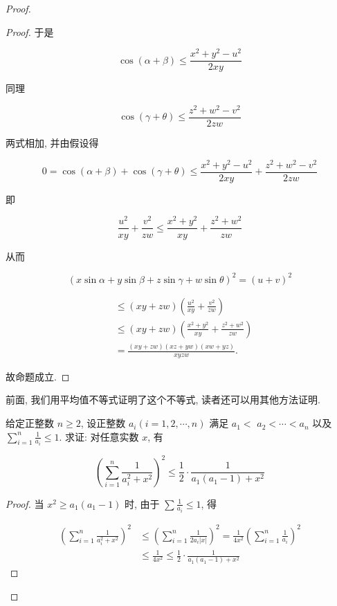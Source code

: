 \begin{proof}
\begin{proof}
	于是
	
	$$
	\cos (\alpha+\beta) \leqslant \frac{x^{2}+y^{2}-u^{2}}{2 x y}
	$$
	
	同理
	
	$$
	\cos (\gamma+\theta) \leqslant \frac{z^{2}+w^{2}-v^{2}}{2 z w}
	$$
	
	两式相加, 并由假设得
	
	$$
	0=\cos (\alpha+\beta)+\cos (\gamma+\theta) \leqslant \frac{x^{2}+y^{2}-u^{2}}{2 x y}+\frac{z^{2}+w^{2}-v^{2}}{2 z w}
	$$
	
	即
	
	$$
	\frac{u^{2}}{x y}+\frac{v^{2}}{z w} \leqslant \frac{x^{2}+y^{2}}{x y}+\frac{z^{2}+w^{2}}{z w}
	$$
	
	从而
	
	$$
	(x \sin \alpha+y \sin \beta+z \sin \gamma+w \sin \theta)^{2}=(u+v)^{2}
	$$
	
	$$
	\begin{aligned}
	& \leqslant(x y+z w)\left(\frac{u^{2}}{x y}+\frac{v^{2}}{z w}\right) \\
	& \leqslant(x y+z w)\left(\frac{x^{2}+y^{2}}{x y}+\frac{z^{2}+w^{2}}{z w}\right) \\
	& =\frac{(x y+z w)(x z+y w)(x w+y z)}{x y z w} .
	\end{aligned}
	$$
	
	故命题成立.
\end{proof}
\begin{note}
	前面, 我们用平均值不等式证明了这个不等式, 读者还可以用其他方法证明.
\end{note}

\begin{example}
	给定正整数 $n \geqslant 2$, 设正整数 $a_{i}(i=1,2, \cdots, n)$ 满足 $a_{1}<$ $a_{2}<\cdots<a_{n}$ 以及 $\sum_{i=1}^{n} \frac{1}{a_{i}} \leqslant 1$. 求证: 对任意实数 $x$, 有
	
	$$
	\left(\sum_{i=1}^{n} \frac{1}{a_{i}^{2}+x^{2}}\right)^{2} \leqslant \frac{1}{2} \cdot \frac{1}{a_{1}\left(a_{1}-1\right)+x^{2}}
	$$
\end{example}
\begin{proof}
	当 $x^{2} \geqslant a_{1}\left(a_{1}-1\right)$ 时, 由于 $\sum \frac{1}{a_{i}} \leqslant 1$, 得
	
	$$
	\begin{aligned}
	\left(\sum_{i=1}^{n} \frac{1}{a_{i}^{2}+x^{2}}\right)^{2} & \leqslant\left(\sum_{i=1}^{n} \frac{1}{2 a_{i}|x|}\right)^{2}=\frac{1}{4 x^{2}}\left(\sum_{i=1}^{n} \frac{1}{a_{i}}\right)^{2} \\
	& \leqslant \frac{1}{4 x^{2}} \leqslant \frac{1}{2} \cdot \frac{1}{a_{1}\left(a_{1}-1\right)+x^{2}}
	\end{aligned}
	$$
	

\end{proof}
\end{proof}
